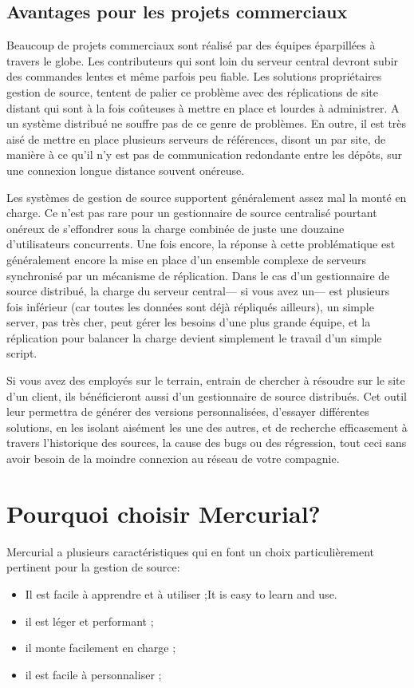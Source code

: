 \subsection{Avantages pour les projets commerciaux}

Beaucoup de projets commerciaux sont réalisé par des équipes éparpillées
à travers le globe. Les contributeurs qui sont loin du serveur central
devront subir des commandes lentes et même parfois peu fiable. Les 
solutions propriétaires gestion de source, tentent de palier ce problème 
avec des réplications de site distant qui sont à la fois coûteuses à mettre
en place et lourdes à administrer. A un système distribué ne souffre pas
de ce genre de problèmes. En outre, il est très aisé de mettre en place
plusieurs serveurs de références, disont un par site, de manière à ce qu'il
n'y est pas de communication redondante entre les dépôts, sur une connexion
longue distance souvent onéreuse.

Les systèmes de gestion de source supportent généralement assez mal la 
monté en charge. Ce n'est pas rare pour un gestionnaire de source centralisé 
pourtant onéreux de s'effondrer sous la charge combinée de juste une douzaine 
d'utilisateurs concurrents. Une fois encore, la réponse à cette problématique 
est généralement encore la mise en place d'un ensemble complexe de serveurs
synchronisé par un mécanisme de réplication. Dans le cas d'un gestionnaire
de source distribué, la charge du serveur central--- si vous avez un--- est
plusieurs fois inférieur (car toutes les données sont déjà répliqués ailleurs),
un simple server, pas très cher, peut gérer les besoins d'une plus grande
équipe, et la réplication pour balancer la charge devient simplement le
travail d'un simple script.

Si vous avez des employés sur le terrain, entrain de chercher à résoudre sur
le site d'un client, ils bénéficieront aussi d'un gestionnaire de source
distribués. Cet outil leur permettra de générer des versions personnalisées,
d'essayer différentes solutions, en les isolant aisément les une des autres,
et de recherche efficasement à travers l'historique des sources, la cause
des bugs ou des régression, tout ceci sans avoir besoin de la moindre 
connexion au réseau de votre compagnie.

\section{Pourquoi choisir Mercurial?}

Mercurial a plusieurs caractéristiques qui en font un choix particulièrement
pertinent pour la gestion de source:
\begin{itemize}
	\item Il est facile à apprendre et à utiliser ;It is easy to learn and use.
	\item il est léger et performant ;
	\item il monte facilement en charge ; 
	\item il est facile à personnaliser ;
\end{itemize}

